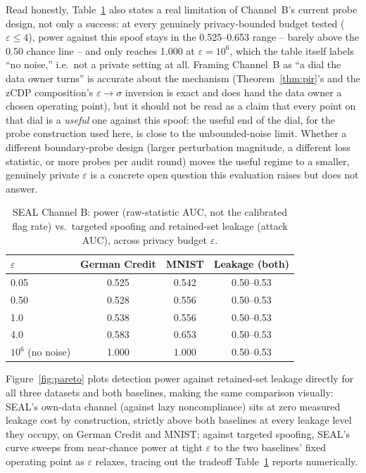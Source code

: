 \documentclass[10pt,journal,compsoc]{IEEEtran}
\begin{document}
Read honestly, Table~\ref{tab:spoof} also states a real limitation of Channel~B's current probe design, not only a success: at every genuinely privacy-bounded budget tested ($\varepsilon \le 4$), power against this spoof stays in the 0.525--0.653 range -- barely above the 0.50 chance line -- and only reaches 1.000 at $\varepsilon = 10^6$, which the table itself labels ``no noise,'' i.e.\ not a private setting at all. Framing Channel~B as ``a dial the data owner turns'' is accurate about the mechanism (Theorem~\ref{thm:pir}'s and the zCDP composition's $\varepsilon\!\to\!\sigma$ inversion is exact and does hand the data owner a chosen operating point), but it should not be read as a claim that every point on that dial is a \emph{useful} one against this spoof: the useful end of the dial, for the probe construction used here, is close to the unbounded-noise limit. Whether a different boundary-probe design (larger perturbation magnitude, a different loss statistic, or more probes per audit round) moves the useful regime to a smaller, genuinely private $\varepsilon$ is a concrete open question this evaluation raises but does not answer.

\begin{table}[t]
\centering
\footnotesize
\caption{SEAL Channel B: power (raw-statistic AUC, not the calibrated flag rate) vs.\ targeted spoofing and retained-set leakage (attack AUC), across privacy budget $\varepsilon$.}
\label{tab:spoof}
\begin{tabular}{@{}lccc@{}}
\toprule
$\varepsilon$ & German Credit & MNIST & Leakage (both) \\
\midrule
0.05 & 0.525 & 0.542 & 0.50--0.53 \\
0.50 & 0.528 & 0.556 & 0.50--0.53 \\
1.0  & 0.538 & 0.556 & 0.50--0.53 \\
4.0  & 0.583 & 0.653 & 0.50--0.53 \\
$10^{6}$ (no noise) & 1.000 & 1.000 & 0.50--0.53 \\
\bottomrule
\end{tabular}
\end{table}

Figure~\ref{fig:pareto} plots detection power against retained-set leakage directly for all three datasets and both baselines, making the same comparison visually: SEAL's own-data channel (against lazy noncompliance) sits at zero measured leakage cost by construction, strictly above both baselines at every leakage level they occupy, on German Credit and MNIST; against targeted spoofing, SEAL's curve sweeps from near-chance power at tight $\varepsilon$ to the two baselines' fixed operating point as $\varepsilon$ relaxes, tracing out the tradeoff Table~\ref{tab:spoof} reports numerically.
\end{document}
